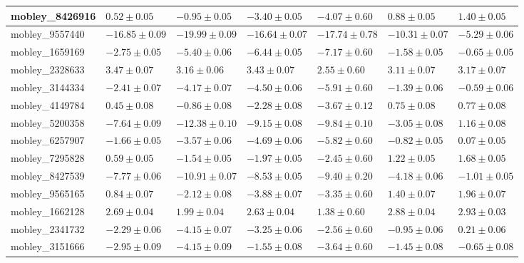 \documentclass{article}
\begin{document}
\begin{landscape}
\begin{longtable}{|l{3.0cm}|l{3.0cm}|l{3.2cm}|l{3.6cm}|l{3.0cm}|l{3.0cm}|l{3.0cm}|}
mobley\_8426916	&	$	0.52	\pm	0.05	$	&	$	-0.95	\pm	0.05	$	&	$	-3.40	\pm	0.05	$	&	$	-4.07	\pm	0.60	$	&	$	0.88	\pm	0.05	$	&	$	1.40	\pm	0.05	$	\\ \hline
mobley\_9557440	&	$	-16.85	\pm	0.09	$	&	$	-19.99	\pm	0.09	$	&	$	-16.64	\pm	0.07	$	&	$	-17.74	\pm	0.78	$	&	$	-10.31	\pm	0.07	$	&	$	-5.29	\pm	0.06	$	\\ \hline
mobley\_1659169	&	$	-2.75	\pm	0.05	$	&	$	-5.40	\pm	0.06	$	&	$	-6.44	\pm	0.05	$	&	$	-7.17	\pm	0.60	$	&	$	-1.58	\pm	0.05	$	&	$	-0.65	\pm	0.05	$	\\ \hline
mobley\_2328633	&	$	3.47	\pm	0.07	$	&	$	3.16	\pm	0.06	$	&	$	3.43	\pm	0.07	$	&	$	2.55	\pm	0.60	$	&	$	3.11	\pm	0.07	$	&	$	3.17	\pm	0.07	$	\\ \hline
mobley\_3144334	&	$	-2.41	\pm	0.07	$	&	$	-4.17	\pm	0.07	$	&	$	-4.50	\pm	0.06	$	&	$	-5.91	\pm	0.60	$	&	$	-1.39	\pm	0.06	$	&	$	-0.59	\pm	0.06	$	\\ \hline
mobley\_4149784	&	$	0.45	\pm	0.08	$	&	$	-0.86	\pm	0.08	$	&	$	-2.28	\pm	0.08	$	&	$	-3.67	\pm	0.12	$	&	$	0.75	\pm	0.08	$	&	$	0.77	\pm	0.08	$	\\ \hline
mobley\_5200358	&	$	-7.64	\pm	0.09	$	&	$	-12.38	\pm	0.10	$	&	$	-9.15	\pm	0.08	$	&	$	-9.84	\pm	0.10	$	&	$	-3.05	\pm	0.08	$	&	$	1.16	\pm	0.08	$	\\ \hline
mobley\_6257907	&	$	-1.66	\pm	0.05	$	&	$	-3.57	\pm	0.06	$	&	$	-4.69	\pm	0.06	$	&	$	-5.82	\pm	0.60	$	&	$	-0.82	\pm	0.05	$	&	$	0.07	\pm	0.05	$	\\ \hline
mobley\_7295828	&	$	0.59	\pm	0.05	$	&	$	-1.54	\pm	0.05	$	&	$	-1.97	\pm	0.05	$	&	$	-2.45	\pm	0.60	$	&	$	1.22	\pm	0.05	$	&	$	1.68	\pm	0.05	$	\\ \hline
mobley\_8427539	&	$	-7.77	\pm	0.06	$	&	$	-10.91	\pm	0.07	$	&	$	-8.53	\pm	0.05	$	&	$	-9.40	\pm	0.20	$	&	$	-4.18	\pm	0.06	$	&	$	-1.01	\pm	0.05	$	\\ \hline
mobley\_9565165	&	$	0.84	\pm	0.07	$	&	$	-2.12	\pm	0.08	$	&	$	-3.88	\pm	0.07	$	&	$	-3.35	\pm	0.60	$	&	$	1.40	\pm	0.07	$	&	$	1.96	\pm	0.07	$	\\ \hline
mobley\_1662128	&	$	2.69	\pm	0.04	$	&	$	1.99	\pm	0.04	$	&	$	2.63	\pm	0.04	$	&	$	1.38	\pm	0.60	$	&	$	2.88	\pm	0.04	$	&	$	2.93	\pm	0.03	$	\\ \hline
mobley\_2341732	&	$	-2.29	\pm	0.06	$	&	$	-4.15	\pm	0.07	$	&	$	-3.25	\pm	0.06	$	&	$	-2.56	\pm	0.60	$	&	$	-0.95	\pm	0.06	$	&	$	0.21	\pm	0.06	$	\\ \hline
mobley\_3151666	&	$	-2.95	\pm	0.09	$	&	$	-4.15	\pm	0.09	$	&	$	-1.55	\pm	0.08	$	&	$	-3.64	\pm	0.60	$	&	$	-1.45	\pm	0.08	$	&	$	-0.65	\pm	0.08	$	\\ \hline

\end{longtable}
\end{landscape}
\end{document}
